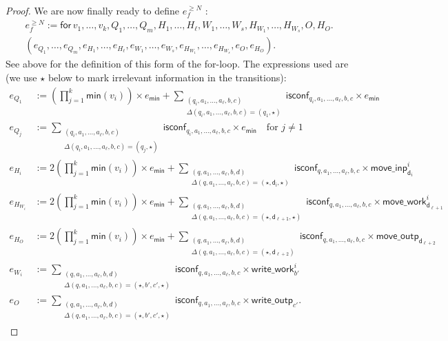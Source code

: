 \begin{proof}
    We are now finally ready to define $e_f^{\geq N}$ :
    \begin{multline*}
    e_f^{\geq N}:= \mathsf{for\,} v_1,\ldots,v_{k},Q_1,\ldots,Q_m,H_1,\ldots,H_\ell,W_1,\ldots,W_s, H_{W_1},\ldots,H_{W_s},O,H_O . \\
    (e_{Q_1},\ldots,e_{Q_m},e_{H_1},\ldots,e_{H_\ell},e_{W_1},\ldots,e_{W_s},e_{H_{W_1}},\ldots,e_{H_{W_s}},e_{O}, e_{H_O}).
    \end{multline*}
    See above for the definition of this form of the for-loop. The expressions used are (we use $\star$ below to mark irrelevant information in the transitions):
    \allowdisplaybreaks
    \begin{align*}
        e_{Q_1}&:=\left(\prod_{j=1}^{k} \textsf{min}(v_i)\right)\times e_{\mathsf{min}}
        + \sum_{\substack{(q_i,a_1,\ldots,a_\ell,b,c)\\
        \Delta(q_i,a_1,\ldots,a_\ell,b,c)=(q_1,\star)}} \!\!\!\!\!\!\!\!\! \mathsf{isconf}_{q_i,a_1,\ldots,a_\ell,b,c}\times e_{\mathsf{min}} \\
        e_{Q_j}&:=\sum_{\substack{(q_i,a_1,\ldots,a_\ell,b,c)\\
        \Delta(q_i,a_1,\ldots,a_\ell,b,c)=(q_j,\star)}} \!\!\!\!\!\!\!\!\! \mathsf{isconf}_{q_i,a_1,\ldots,a_\ell,b,c}\times e_{\mathsf{min}}
        \quad \text{for $j\neq 1$}\\
        e_{H_i}&:=2\left(\prod_{j=1}^{k} \textsf{min}(v_i)\right)\times e_{\mathsf{min}}
        +\sum_{\substack{(q,a_1,\ldots,a_\ell,b,d)\\
        \Delta(q,a_1,\ldots,a_\ell,b,c)=(\star,\mathsf{d_i},\star)}}\!\!\!\!\!\!\!\!\! \mathsf{isconf}_{q,a_1,\ldots,a_\ell,b,c}\times\mathsf{move\_inp}^i_{\mathsf{d}_i}\\
        e_{H_{W_i}}&:=2\left(\prod_{j=1}^{k} \textsf{min}(v_i)\right)\times e_{\mathsf{min}}
        +\sum_{\substack{(q,a_1,\ldots,a_\ell,b,d)\\
        \Delta(q,a_1,\ldots,a_\ell,b,c)=(\star,\mathsf{d_{\ell+1}},\star)}}\!\!\!\!\!\!\!\!\! \mathsf{isconf}_{q,a_1,\ldots,a_\ell,b,c}\times\mathsf{move\_work}_{\mathsf{d}_{\ell+1}}^i\\
        e_{H_O}&:=2\left(\prod_{j=1}^{k} \textsf{min}(v_i)\right)\times e_{\mathsf{min}}
        +\sum_{\substack{(q,a_1,\ldots,a_\ell,b,d)\\
        \Delta(q,a_1,\ldots,a_\ell,b,c)=(\star,\mathsf{d}_{\ell+2})}}\!\!\!\!\!\!\!\!\! \mathsf{isconf}_{q,a_1,\ldots,a_\ell,b,c}\times\mathsf{move\_outp}_{\mathsf{d}_{\ell+2}}\\
        e_{W_i}&:=\sum_{\substack{(q,a_1,\ldots,a_\ell,b,d)\\
        \Delta(q,a_1,\ldots,a_\ell,b,c)=(\star,b',c',\star)}}\!\!\!\!\!\!\!\!\! \mathsf{isconf}_{q,a_1,\ldots,a_\ell,b,c}\times\mathsf{write\_work}_{b'}^i\\
        e_{O}&:=\sum_{\substack{(q,a_1,\ldots,a_\ell,b,d)\\
        \Delta(q,a_1,\ldots,a_\ell,b,c)=(\star,b',c',\star)}}\!\!\!\!\!\!\!\!\! \mathsf{isconf}_{q,a_1,\ldots,a_\ell,b,c}\times\mathsf{write\_outp}_{c'}.
    \end{align*}


\end{proof}
